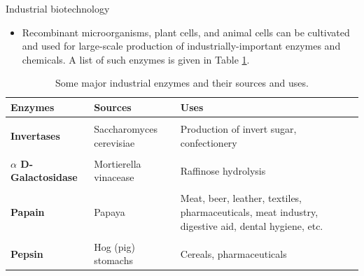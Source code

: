 \documentclass[
  ignorenonframetext,
  aspectratio=169]{beamer}
\providecommand{\tightlist}{%
  \setlength{\itemsep}{0pt}\setlength{\parskip}{0pt}}
\begin{document}
\begin{frame}{Industrial biotechnology}
\protect\hypertarget{industrial-biotechnology}{}
\begin{itemize}
\tightlist
\item
  Recombinant microorganisms, plant cells, and animal cells can be
  cultivated and used for large-scale production of
  industrially-important enzymes and chemicals. A list of such enzymes
  is given in Table \ref{tab:industrial-chemicals}.
\end{itemize}

\begin{table}

\caption{\label{tab:industrial-chemicals}Some major industrial enzymes and their sources and uses.}
\centering
\fontsize{5}{7}\selectfont
\begin{tabular}[t]{>{\raggedright\arraybackslash}p{8em}>{\raggedright\arraybackslash}p{26em}>{\raggedright\arraybackslash}p{30em}}
\toprule
Enzymes & Sources & Uses\\
\midrule
\textbf{\cellcolor{gray!6}{Amylases}} & \cellcolor{gray!6}{Aspergillus niger, A. oryzae, B. licheniformis, B. subtilis, germinating cereals germinating barley} & \cellcolor{gray!6}{Hydrolyze starch to glucose, detergents, baked goods, milk cheese, fruit juice, digestive medicines, dental care}\\
\textbf{Invertases} & Saccharomyces cerevisiae & Production of invert sugar, confectionery\\
\textbf{\cellcolor{gray!6}{Glucose isomerase}} & \cellcolor{gray!6}{Arthrobacter globiformis, Actomoplanes missouriensis, Streptomyces solivaceus and E. coli} & \cellcolor{gray!6}{Conversion of glucose to fructose production of high fructose syrup, other beverages, and food}\\
\textbf{$\alpha$ D-Galactosidase} & Mortierella vinacease & Raffinose hydrolysis\\
\textbf{\cellcolor{gray!6}{$\beta$ D-Galactosidase}} & \cellcolor{gray!6}{Aspergillus niger} & \cellcolor{gray!6}{Lactose hydrolysis}\\
\addlinespace
\textbf{Papain} & Papaya & Meat, beer, leather, textiles, pharmaceuticals, meat industry, digestive aid, dental hygiene, etc.\\
\textbf{\cellcolor{gray!6}{Proteases}} & \cellcolor{gray!6}{Bacillus subtilis, B. licheniformis} & \cellcolor{gray!6}{Detergents, meat tenderizers, beer, cheese, flavor production}\\
\textbf{Pepsin} & Hog (pig) stomachs & Cereals, pharmaceuticals\\

\end{tabular}
\end{table}
\end{frame}
\end{document}
